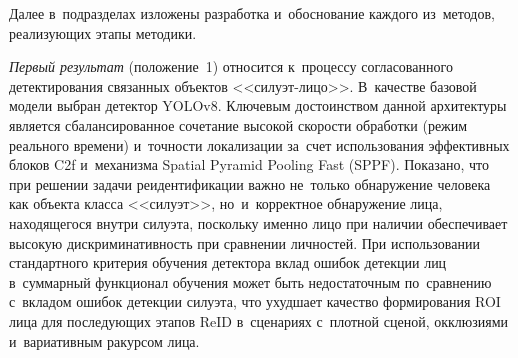 \begin{table}[H]
\centering
\caption{Соответствие этапов комплексной методики методам, выносимым
на~защиту}
\label{tab:method-mapping}
\end{table}

Далее в~подразделах изложены разработка и~обоснование каждого
из~методов, реализующих этапы методики.

\textit{Первый результат} (положение~1) относится к~процессу
согласованного детектирования связанных объектов <<силуэт-лицо>>. В~качестве базовой модели выбран детектор YOLOv8.
Ключевым достоинством данной архитектуры является сбалансированное сочетание
высокой скорости обработки (режим реального времени) и~точности локализации
за~счет использования эффективных блоков C2f и~механизма Spatial Pyramid
Pooling Fast (SPPF). Показано, что при решении задачи реидентификации важно
не~только обнаружение человека как объекта класса <<силуэт>>, но~и~корректное
обнаружение лица, находящегося внутри силуэта, поскольку именно лицо
при наличии обеспечивает высокую дискриминативность при сравнении
личностей. При использовании стандартного критерия обучения детектора
вклад ошибок детекции лиц в~суммарный функционал обучения может быть
недостаточным по~сравнению с~вкладом ошибок детекции силуэта, что ухудшает
качество формирования ROI лица для последующих этапов ReID в~сценариях
с~плотной сценой, окклюзиями и~вариативным ракурсом лица.

